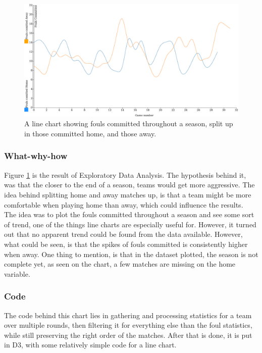 \documentclass[Report.tex]{subfiles}
\begin{document}
\begin{figure}
\center
\includegraphics[width=\textwidth]{Figures/fouls.pdf}
\caption{A line chart showing fouls committed throughout a season, split up in those committed home, and those away.}
\label{Fig:FOULS}
\end{figure}


\subsubsection{What-why-how}
Figure \ref{Fig:FOULS} is the result of Exploratory Data Analysis. The hypothesis behind it, was that the closer to the end of a season, teams would get more aggressive. The idea behind splitting home and away matches up, is that a team might be more comfortable when playing home than away, which could influence the results.\\
The idea was to plot the fouls committed throughout a season and see some sort of trend, one of the things line charts are especially useful for. However, it turned out that no apparent trend could be found from the data available. However, what could be seen, is that the spikes of fouls committed is consistently higher when away. One thing to mention, is that in the dataset plotted, the season is not complete yet, as seen on the chart, a few matches are missing on the home variable.

\subsubsection{Code}
The code behind this chart lies in gathering and processing statistics for a team over multiple rounds, then filtering it for everything else than the foul statistics, while still preserving the right order of the matches. After that is done, it is put in D3, with some relatively simple code for a line chart.
\end{document}

